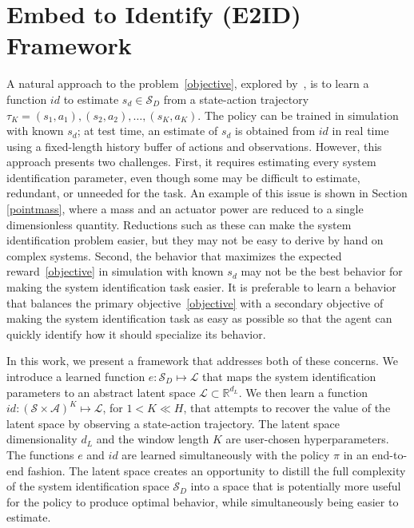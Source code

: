\documentclass{article}
\newcommand{\R}{\mathbb{R}}
\newcommand{\cA}{\mathcal{A}}
\newcommand{\cL}{\mathcal{L}}
\newcommand{\cS}{\mathcal{S}}
\newcommand{\embedfn}{e}
\newcommand{\idfn}{id}
\newcommand{\latent}{\cL}
\newcommand{\secref}[1]{Section \ref{#1}}
\begin{document}
\section{Embed to Identify (E2ID) Framework}
A natural approach to the problem~\eqref{objective}, explored by~\citet{yu-up-osi-rss17},
is to learn a function $\idfn$ to estimate $s_d \in \cS_D$ from a state-action trajectory $\tau_K = (s_1, a_1), (s_2, a_2), \dots, (s_K, a_K)$.
The policy can be trained in simulation with known $s_d$;
at test time, an estimate of $s_d$ is obtained from $\idfn$ in real time using a fixed-length history buffer of actions and observations.
However, this approach presents two challenges.
%
First, it requires estimating every system identification parameter,
even though some may be difficult to estimate, redundant, or unneeded for the task.
An example of this issue is shown in \secref{pointmass},
where a mass and an actuator power are reduced to a single dimensionless quantity.
Reductions such as these can make the system identification problem easier, but they may not be easy to derive by hand on complex systems.
%
Second, the behavior that maximizes the expected reward~\eqref{objective}
in simulation with known $s_d$ may not be the best behavior for making the system identification task easier.
It is preferable to learn a behavior that balances the primary objective~\eqref{objective}
with a secondary objective of making the system identification task as easy as possible so that the agent can quickly identify how it should specialize its behavior.

In this work, we present a framework that addresses both of these concerns.
We introduce a learned function $\embedfn : \cS_D \mapsto \latent$
that maps the system identification parameters to an abstract latent space $\latent \subset \R^{d_L}$.
We then learn a function $\idfn : (\cS \times \cA)^K \mapsto \latent$, for $1 < K \ll H$,
that attempts to recover the value of the latent space by observing a state-action trajectory.
The latent space dimensionality $d_L$ and the window length $K$ are user-chosen hyperparameters.
The functions $\embedfn$ and $\idfn$ are learned simultaneously with the policy $\pi$ in an end-to-end fashion.
The latent space creates an opportunity to distill the full complexity of the system identification space $\cS_D$ into a space that is potentially more useful for the policy to produce optimal behavior,
while simultaneously being easier to estimate.
\end{document}
